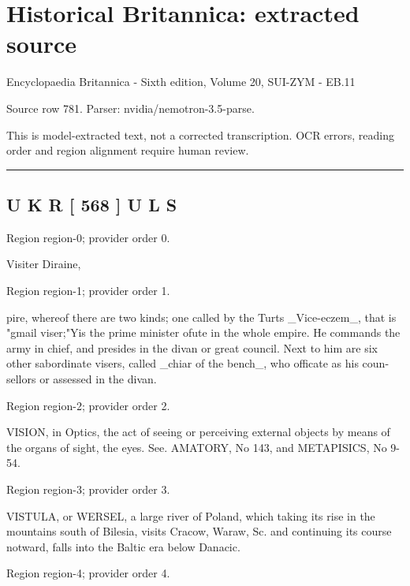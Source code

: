 \documentclass[11pt]{article}
\begin{document}
\section*{Historical Britannica: extracted source}
Encyclopaedia Britannica - Sixth edition, Volume 20, SUI-ZYM - EB.11\par
{\small Source row 781. Parser: nvidia/nemotron-3.5-parse.\par}
{\small This is model-extracted text, not a corrected transcription. OCR errors, reading order and region alignment require human review.\par}
\hrule\medskip
\subsection*{U K R [ 568 ] U L S}

{\scriptsize\color{gray} Region region-0; provider order 0.\par}
\medskip

Visiter
Diraine,
\par

{\scriptsize\color{gray} Region region-1; provider order 1.\par}
\medskip

pire, whereof there are two kinds; one called by the
Turts \_Vice-eczem\_, that is "gmail viser;"Yis the prime minister ofute in the whole empire. He commands
the army in chief, and presides in the divan or great council. Next to him are six other sabordinate visers,
called \_chiar of the bench\_, who officate as his coun-
sellors or assessed in the divan.
\par

{\scriptsize\color{gray} Region region-2; provider order 2.\par}
\medskip

VISION, in Optics, the act of seeing or perceiving
external objects by means of the organs of sight, the eyes.
See. AMATORY, No 143, and METAPISICS, No 9-
54.
\par

{\scriptsize\color{gray} Region region-3; provider order 3.\par}
\medskip

VISTULA, or WERSEL, a large river of Poland,
which taking its rise in the mountains south of Bilesia,
visits Cracow, Waraw, Sc. and continuing its course
notward, falls into the Baltic era below Danacic.
\par

{\scriptsize\color{gray} Region region-4; provider order 4.\par}
\medskip
\end{document}
